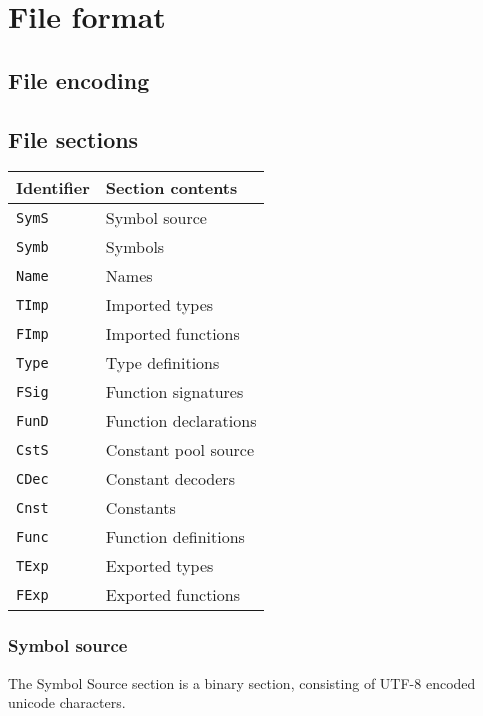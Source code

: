 \documentclass[a4paper]{report}
\begin{document}

\chapter{File format}
\label{ch:fileformat}

\section{File encoding}

\section{File sections}

\begin{tabular}{ll}
\hline
\hline
Identifier & Section contents\\
\hline
\tt SymS & Symbol source\\        %
\tt Symb & Symbols\\              %
\tt Name & Names\\                %

\tt TImp & Imported types\\       %
\tt FImp & Imported functions\\   %

\tt Type & Type definitions\\     %
\tt FSig & Function signatures\\  %
\tt FunD & Function declarations\\ %
\tt CstS & Constant pool source\\ %
\tt CDec & Constant decoders\\    %
\tt Cnst & Constants\\            %

\tt Func & Function definitions\\ %
\tt TExp & Exported types\\       %
\tt FExp & Exported functions\\   %
\hline
\hline
\end{tabular}


\subsection{Symbol source}
The Symbol Source section is a binary section, consisting of UTF-8 encoded unicode characters.
\end{document}
